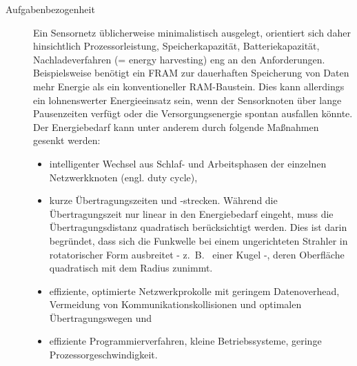 \begin{description}
	\item [Aufgabenbezogenheit] Ein Sensornetz üblicherweise minimalistisch ausgelegt, orientiert sich daher hinsichtlich Prozessorleistung, Speicherkapazität, Batteriekapazität, Nachladeverfahren (= energy harvesting) eng an den Anforderungen. Beispielsweise benötigt ein FRAM zur dauerhaften Speicherung von Daten mehr Energie als ein konventioneller RAM-Baustein. Dies kann allerdings ein lohnenswerter Energieeinsatz sein, wenn der Sensorknoten über lange Pausenzeiten verfügt oder die Versorgungsenergie spontan ausfallen könnte. Der Energiebedarf kann unter anderem durch folgende Maßnahmen gesenkt werden:
	\begin{itemize}
		\item intelligenter Wechsel aus Schlaf- und Arbeitsphasen der einzelnen Netzwerkknoten (engl. duty cycle),
		\item kurze Übertragungszeiten und -strecken. Während die Übertragungszeit nur linear in den Energiebedarf eingeht, muss die Übertragungsdistanz quadratisch berücksichtigt werden. Dies ist darin begründet, dass sich die Funkwelle bei einem ungerichteten Strahler in rotatorischer Form ausbreitet - z.~B.~ einer Kugel -, deren Oberfläche quadratisch mit dem Radius zunimmt.
		\item effiziente, optimierte Netzwerkprokolle mit geringem Datenoverhead, Vermeidung von Kommunikationskollisionen und optimalen Übertragungswegen und
		\item effiziente Programmierverfahren, kleine Betriebssysteme, geringe Prozessorgeschwindigkeit.
	\end{itemize}
	

\end{description}
